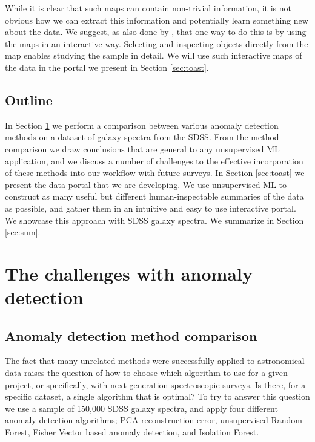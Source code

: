 \documentclass[fleqn,usenatbib]{mnras}
\begin{document}
While it is clear that such maps can contain non-trivial information, it is not obvious how we can extract this information and potentially learn something new about the data. We suggest, as also done by \citet{in-der-au12}, that one way to do this is  by using the maps in an interactive way. Selecting and inspecting objects directly from the map  enables studying the sample in detail. We will use such interactive maps of the data in the portal we present in Section \ref{sec:toast}. 


\subsection{Outline}

In Section \ref{sec:uml} we  perform a comparison between various anomaly detection methods on a dataset of galaxy spectra from the SDSS.  From the method comparison we draw conclusions that are general to any unsupervised ML application, and we discuss a number of challenges to the effective incorporation of these methods into our workflow with future surveys. In Section \ref{sec:toast} we present the data portal that we are developing. We use unsupervised ML  to construct as many useful but different human-inspectable summaries of the data as possible, and gather them in an intuitive and easy to use interactive portal. We showcase this approach with SDSS galaxy spectra. We summarize in Section \ref{sec:sum}.



\section{The challenges with anomaly detection}
\label{sec:uml}



\subsection{Anomaly detection method comparison}
\label{sec:comparison}

The fact that many unrelated methods were successfully applied to astronomical data raises the question of how to choose which algorithm to use for a given project, or specifically, with next generation spectroscopic surveys. Is there, for a specific dataset, a single algorithm that is optimal?  To try to answer this question we use a sample of 150,000  SDSS galaxy spectra, and  apply four different anomaly detection algorithms; PCA reconstruction error, unsupervised Random Forest,  Fisher Vector based anomaly detection, and Isolation Forest.
\end{document}
